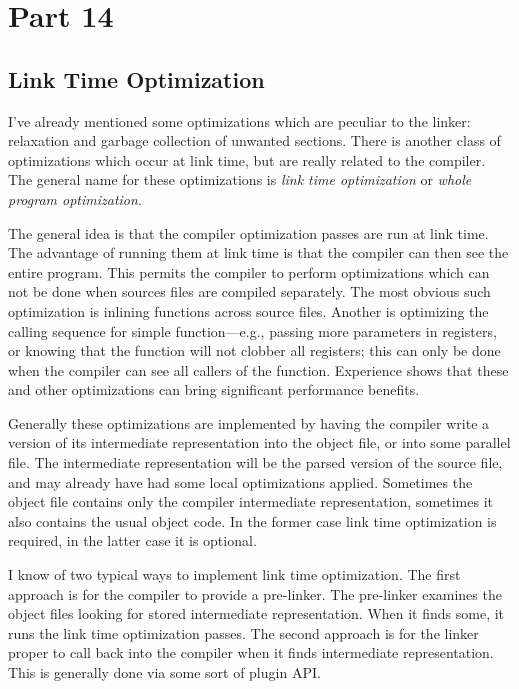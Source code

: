 \section{Part 14}

\subsection{Link Time Optimization}

I've already mentioned some optimizations which are peculiar to the linker:
relaxation and garbage collection of unwanted sections. There is another
class of optimizations which occur at link time, but are really related to
the compiler. The general name for these optimizations is \emph{link time
optimization} or \emph{whole program optimization}.

The general idea is that the compiler optimization passes are run at link
time. The advantage of running them at link time is that the compiler can then
see the entire program. This permits the compiler to perform optimizations
which can not be done when sources files are compiled separately. The most
obvious such optimization is inlining functions across source files. Another
is optimizing the calling sequence for simple function---e.g., passing more
parameters in registers, or knowing that the function will not clobber all
registers; this can only be done when the compiler can see all callers of
the function. Experience shows that these and other optimizations can bring
significant performance benefits.

Generally these optimizations are implemented by having the compiler write
a version of its intermediate representation into the object file, or into
some parallel file. The intermediate representation will be the parsed
version of the source file, and may already have had some local optimizations
applied. Sometimes the object file contains only the compiler intermediate
representation, sometimes it also contains the usual object code. In the former
case link time optimization is required, in the latter case it is optional.

I know of two typical ways to implement link time optimization. The first
approach is for the compiler to provide a pre-linker. The pre-linker examines
the object files looking for stored intermediate representation. When it finds
some, it runs the link time optimization passes. The second approach is for
the linker proper to call back into the compiler when it finds intermediate
representation. This is generally done via some sort of plugin API\@.

